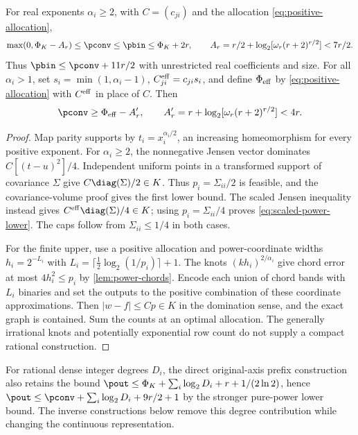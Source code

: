 \begin{proposition}\label{prop:pure-power-finite}
For real exponents $\alpha_i\ge2$, with $C=(c_{ji})$ and the
allocation \eqref{eq:positive-allocation},
\begin{equation}\label{eq:pure-power-finite}
 \max(0,\Phi_K-A_r)\le\pconv\le\pbin\le\Phi_K+2r,
 \qquad A_r=r/2+\log_2[\omega_r(r+2)^{r/2}]<7r/2.
\end{equation}
Thus $\pbin\le\pconv+11r/2$ with unrestricted real coefficients
and size. For all $\alpha_i>1$, set $s_i=\min(1,\alpha_i-1)$,
$C^{\rm eff}_{ji}=c_{ji}s_i$, and define $\Phi_{\rm eff}$ by
\eqref{eq:positive-allocation} with $C^{\rm eff}$ in place of $C$.
Then
\begin{equation}\label{eq:scaled-power-lower}
 \pconv\ge\Phi_{\rm eff}-A_r',
 \qquad A_r'=r+\log_2[\omega_r(r+2)^{r/2}]<4r.
\end{equation}
\end{proposition}
\begin{proof}
Map parity supports by $t_i=x_i^{\alpha_i/2}$, an increasing
homeomorphism for every positive exponent. For $\alpha_i\ge2$, the
nonnegative Jensen vector dominates $C[(t-u)^2]/4$. Independent
uniform points in a transformed support of covariance $\Sigma$ give
$C\diag(\Sigma)/2\in K$. Thus $p_i=\Sigma_{ii}/2$ is feasible,
and the covariance-volume proof gives the first lower bound. The
scaled Jensen inequality instead gives
$C^{\rm eff}\diag(\Sigma)/4\in K$; using
$p_i=\Sigma_{ii}/4$ proves \eqref{eq:scaled-power-lower}.
The caps follow from $\Sigma_{ii}\le1/4$ in both cases.

For the finite upper, use a positive allocation and power-coordinate
widths $h_i=2^{-L_i}$ with
$L_i=\lceil\frac12\log_2(1/p_i)\rceil+1$.
The knots $(kh_i)^{2/\alpha_i}$ give chord error at most
$4h_i^2\le p_i$ by \cref{lem:power-chords}. Encode each union of
chord bands with $L_i$ binaries and set the outputs to the positive
combination of these coordinate approximations. Then
$|w-f|\le Cp\in K$ in the domination sense, and the exact graph is
contained. Sum the counts at an optimal allocation. The generally
irrational knots and potentially exponential row count do not supply
a compact rational construction.
\end{proof}

For rational dense integer degrees $D_i$, the direct original-axis
prefix construction also retains the bound
$\pout\le\Phi_K+\sum_i\log_2D_i+r+1/(2\ln2)$, hence
$\pout\le\pconv+\sum_i\log_2D_i+9r/2+1$ by the stronger
pure-power lower bound. The inverse constructions below remove this
degree contribution while changing the continuous representation.

